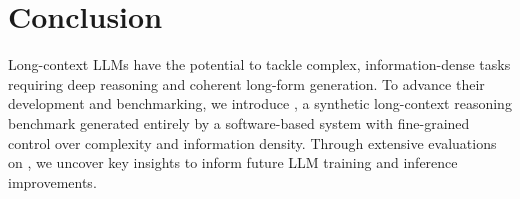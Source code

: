 \section{Conclusion} 
Long-context LLMs have the potential to tackle complex, information-dense tasks requiring deep reasoning and coherent long-form generation. To advance their development and benchmarking, we introduce \sysb, a synthetic long-context reasoning benchmark generated entirely by a software-based system with fine-grained control over complexity and information density. Through extensive evaluations on \sysb, we uncover key insights to inform future LLM training and inference improvements.

